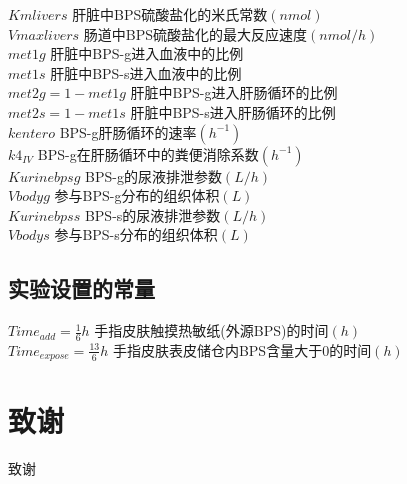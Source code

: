 \documentclass[a4paper,punct=banjiao,twoside]{ctexrep}
\theoremstyle{plain}
\theoremstyle{definition}
\theoremstyle{remark}
\begin{document}
$ Kmlivers$ {\hfill  肝脏中BPS硫酸盐化的米氏常数$(nmol)$}\\
$Vmaxlivers$ {\hfill  肠道中BPS硫酸盐化的最大反应速度$(nmol/h)$}\\
$met1g $ {\hfill  肝脏中BPS-g进入血液中的比例}\\
$ met1s$ {\hfill  肝脏中BPS-s进入血液中的比例}\\
$met2g = 1 -  met1g$ {\hfill  肝脏中BPS-g进入肝肠循环的比例}\\
$ met2s= 1 -  met1s$ {\hfill  肝脏中BPS-s进入肝肠循环的比例}\\
$ kentero$ {\hfill  BPS-g肝肠循环的速率$(h^{-1})$}\\
$k4_{IV} $ {\hfill  BPS-g在肝肠循环中的粪便消除系数$(h^{-1})$}\\
$ Kurinebpsg$ {\hfill  BPS-g的尿液排泄参数$(L/h)$}\\
$Vbodyg  $ {\hfill  参与BPS-g分布的组织体积$(L)$}\\
$ Kurinebpss$ {\hfill  BPS-s的尿液排泄参数$(L/h)$}\\
$ Vbodys$ {\hfill  参与BPS-s分布的组织体积$(L)$}

\section*{实验设置的常量}
\noindent$Time_{add}=\frac{1}{6}h$ {\hfill  手指皮肤触摸热敏纸(外源BPS)的时间$(h)$}\\
$Time_{expose}=\frac{13}{6}h$ {\hfill  手指皮肤表皮储仓内BPS含量大于0的时间$(h)$}\\
\clearpage
\mbox{}
\thispagestyle{empty}


% 



\clearpage
\mbox{}
\thispagestyle{empty}

\chapter*{致\quad 谢}
\normalsize
致谢
\end{document}
